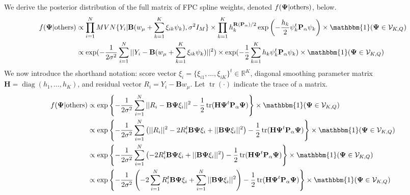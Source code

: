 \documentclass[12pt]{article}
\DeclareMathOperator{\diag}{diag}
\DeclareMathOperator{\tr}{tr}
\begin{document}
We derive the posterior distribution of the full matrix of FPC spline weights, denoted $f(\boldsymbol{\Psi}|{\rm others})$, below.
\begin{align*}
    f(\boldsymbol{\Psi}|{\rm others}) & \propto \prod_{i = 1}^N MVN\{Y_i|\mathbf{B}(w_{\mu} + \sum_{k = 1}^K \xi_{ik} \psi_{k}), \sigma^2 I_M\} \times \prod_{k = 1}^K h_k^{\mathbf{R}(\mathbf{P}_\alpha)/2}\exp\left(-\frac{h_k}{2}\psi_k^t\mathbf{P}_{\alpha}\psi_k\right) \times \mathbbm{1}(\boldsymbol{\Psi} \in \mathcal{V}_{K,Q})\\
    & \propto \exp(-\frac{1}{2\sigma^2}\sum_{i = 1}^N||Y_i - \mathbf{B}(w_\mu + \sum_{k  =1}^K \xi_{ik} \psi_k)||^2) \times \exp(-\frac{1}{2}\sum_{k = 1}^K h_k \psi_k^t \mathbf{P}_\alpha \psi_k) \times \mathbbm{1}(\boldsymbol{\Psi} \in \mathcal{V}_{K,Q})
\end{align*}
We now introduce the shorthand notation: score vector $\xi_i = \{\xi_{i1}, \ldots, \xi_{iK}\}^t \in \mathbb{R}^K$, diagonal smoothing parameter matrix $\mathbf{H} = \diag(h_1, \ldots, h_K)$, and residual vector $R_i = Y_i - \mathbf{B}w_\mu$. Let $\tr(\cdot)$ indicate the trace of a matrix.
\begin{align*}
    f(\boldsymbol{\Psi}|{\rm others}) & \propto \exp\left\{-\frac{1}{2\sigma^2}\sum_{i = 1}^N||R_i -  \mathbf{B}\boldsymbol{\Psi}\xi_i||^2 -\frac{1}{2}\tr(\mathbf{H} \boldsymbol{\Psi}^t \mathbf{P}_\alpha \boldsymbol{\Psi})\right\} \times \mathbbm{1}(\boldsymbol{\Psi} \in \mathcal{V}_{K,Q})\\
    & \propto \exp\left\{-\frac{1}{2\sigma^2}\sum_{i = 1}^N\left(||R_i||^2 - 2R_i^t \mathbf{B}\boldsymbol{\Psi}\xi_i + ||\mathbf{B}\boldsymbol{\Psi}\xi_i||^2\right) -\frac{1}{2}\tr(\mathbf{H} \boldsymbol{\Psi}^t \mathbf{P}_\alpha \boldsymbol{\Psi})\right\} \times \mathbbm{1}(\boldsymbol{\Psi} \in \mathcal{V}_{K,Q})\\
    & \propto \exp\left\{-\frac{1}{2\sigma^2}\sum_{i = 1}^N\left( - 2R_i^t \mathbf{B}\boldsymbol{\Psi}\xi_i + ||\mathbf{B}\boldsymbol{\Psi}\xi_i||^2\right) -\frac{1}{2}\tr(\mathbf{H} \boldsymbol{\Psi}^t \mathbf{P}_\alpha \boldsymbol{\Psi})\right\} \times \mathbbm{1}(\boldsymbol{\Psi} \in \mathcal{V}_{K,Q})\\
    & \propto \exp\left\{-\frac{1}{2\sigma^2}\left(- 2 \sum_{i = 1}^N R_i^t \mathbf{B}\boldsymbol{\Psi}\xi_i + \sum_{i = 1}^N||\mathbf{B}\boldsymbol{\Psi}\xi_i||^2\right) -\frac{1}{2}\tr(\mathbf{H} \boldsymbol{\Psi}^t \mathbf{P}_\alpha \boldsymbol{\Psi})\right\} \times \mathbbm{1}(\boldsymbol{\Psi} \in \mathcal{V}_{K,Q})
\end{align*}
\end{document}
